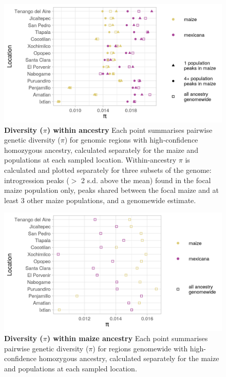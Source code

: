 \begin{figure}[ht]
\includegraphics[width=\textwidth]{chapter2/figures/pi_within_mexicana_ancestry_peaks.png}
\caption{\color{Gray} \textbf{Diversity ($\pi$) within \mexicana ancestry} Each point summarises pairwise genetic diversity ($\pi$) for genomic regions with high-confidence homozygous \mexicana ancestry, calculated separately for the maize and \mexicana populations at each sampled location. Within-\mexicana ancestry $\pi$ is calculated and plotted separately for three subsets of the genome: introgression peaks ($>$ 2 s.d. above the mean) found in the focal maize population only, peaks shared between the focal maize and at least 3 other maize populations, and a genomewide estimate.}
\label{pi_mexicana_ancestry_peaks}
\end{figure}

\begin{figure}[ht]
\includegraphics[width=\textwidth]{chapter2/figures/pi_within_maize_ancestry.png}
\caption{\color{Gray} \textbf{Diversity ($\pi$) within maize ancestry} Each point summarises pairwise genetic diversity ($\pi$) for regions genomewide with high-confidence homozygous \mexicana ancestry, calculated separately for the maize and \mexicana populations at each sampled location.}
\label{pi_maize_ancestry}
\end{figure}

